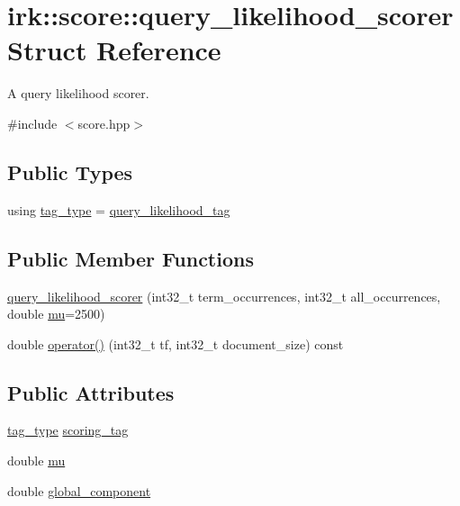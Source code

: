\hypertarget{structirk_1_1score_1_1query__likelihood__scorer}{}\section{irk\+:\+:score\+:\+:query\+\_\+likelihood\+\_\+scorer Struct Reference}
\label{structirk_1_1score_1_1query__likelihood__scorer}


A query likelihood scorer.  




{\ttfamily \#include $<$score.\+hpp$>$}

\subsection*{Public Types}
\begin{DoxyCompactItemize}
\item 
using \mbox{\hyperlink{structirk_1_1score_1_1query__likelihood__scorer_a4a7795fbd9f018d25bdc59c5ae001e2a}{tag\+\_\+type}} = \mbox{\hyperlink{structirk_1_1score_1_1query__likelihood__tag}{query\+\_\+likelihood\+\_\+tag}}
\end{DoxyCompactItemize}
\subsection*{Public Member Functions}
\begin{DoxyCompactItemize}
\item 
\mbox{\hyperlink{structirk_1_1score_1_1query__likelihood__scorer_ae1e3acdf44043bb428c4b281389f18c7}{query\+\_\+likelihood\+\_\+scorer}} (int32\+\_\+t term\+\_\+occurrences, int32\+\_\+t all\+\_\+occurrences, double \mbox{\hyperlink{structirk_1_1score_1_1query__likelihood__scorer_a9322ba7c56a58a417ac72b33e93e7300}{mu}}=2500)
\item 
double \mbox{\hyperlink{structirk_1_1score_1_1query__likelihood__scorer_a10b21ff85043b297a8970a2e8a230658}{operator()}} (int32\+\_\+t tf, int32\+\_\+t document\+\_\+size) const
\end{DoxyCompactItemize}
\subsection*{Public Attributes}
\begin{DoxyCompactItemize}
\item 
\mbox{\hyperlink{structirk_1_1score_1_1query__likelihood__scorer_a4a7795fbd9f018d25bdc59c5ae001e2a}{tag\+\_\+type}} \mbox{\hyperlink{structirk_1_1score_1_1query__likelihood__scorer_ab0248969eb132cf91b9b6103d7d2568e}{scoring\+\_\+tag}}
\item 
double \mbox{\hyperlink{structirk_1_1score_1_1query__likelihood__scorer_a9322ba7c56a58a417ac72b33e93e7300}{mu}}
\item 
double \mbox{\hyperlink{structirk_1_1score_1_1query__likelihood__scorer_ab32a8a554078c02c337eeb6fc585be2f}{global\+\_\+component}}
\end{DoxyCompactItemize}


